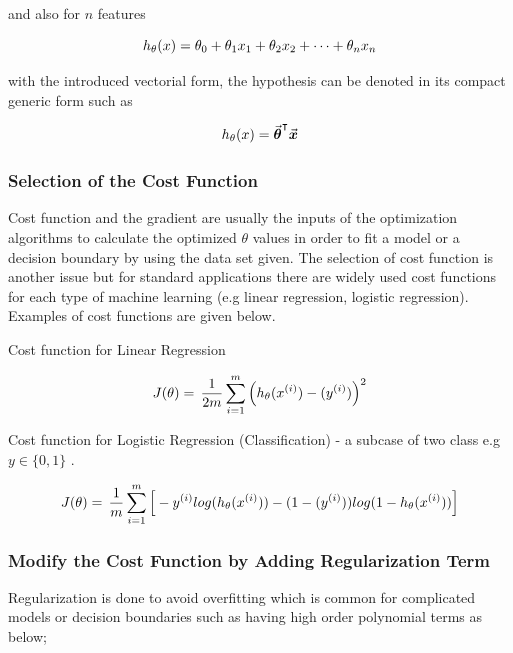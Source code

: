 and also for $n$ features

\begin{equation}{\label{eqn:costFuncMltplFeature}}
h_{\theta}(x) = \theta_0 + \theta_1 x_1 + \theta_2 x_2 + \cdots+ \theta_n x_n
\end{equation}

with the introduced vectorial form, the hypothesis can be denoted in its compact generic form such as 

\begin{equation}{\label{eqn:costFuncMltplFeature}}
h_{\theta}(x) = {\vec{\bm{\theta}}}^\intercal \vec{\bm{x}}
\end{equation}

\subsubsection{Selection of the Cost Function}

Cost function and the gradient are usually the inputs of the optimization algorithms to calculate the optimized $\theta$ values in order to fit a model or a decision boundary by using the data set given. 
The selection of cost function is another issue but for standard applications there are widely used cost functions for each type of machine learning (e.g linear regression, logistic regression). 
Examples of cost functions are given below. 

Cost function for Linear Regression 

\begin{equation}{\label{eqn:costFuncLinearRegression}}
J(\theta)
=\,
\frac{1}{2m} \sum\limits_{i=1}^{m} \Big(h_\theta(x^{(i)}) - (y^{(i)})\Big)^2  
\end{equation} 

Cost function for Logistic Regression (Classification) - a subcase of two class e.g $y \in \{0,1\}$ . 

\begin{equation}{\label{eqn:costFuncLogisticRegression}}
J(\theta)
=\,
\frac{1}{m} \sum\limits_{i=1}^{m} \Big[-y^{(i)}log(h_\theta(x^{(i)})) - (1-(y^{(i)}))log(1-h_\theta(x^{(i)}))\Big]
\end{equation} 

\subsubsection{Modify the Cost Function by Adding Regularization Term}

Regularization is done to avoid overfitting which is common for complicated models or decision boundaries such as having high order polynomial terms as below;

